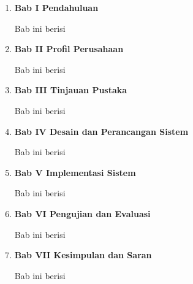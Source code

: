 \begin{enumerate}[nolistsep]

  \item \textbf{Bab I Pendahuluan}
  \vspace{0.5ex}

  Bab ini berisi \lipsum[1][1-3]
  \vspace{0.5ex}

  \item \textbf{Bab II Profil Perusahaan}
  \vspace{0.5ex}

  Bab ini berisi \lipsum[1][1-3]
  \vspace{0.5ex}

  \item \textbf{Bab III Tinjauan Pustaka}
  \vspace{0.5ex}

  Bab ini berisi \lipsum[1][1-3]
  \vspace{0.5ex}

  \item \textbf{Bab IV Desain dan Perancangan Sistem}
  \vspace{0.5ex}

  Bab ini berisi \lipsum[1][1-3]
  \vspace{0.5ex}

  \item \textbf{Bab V Implementasi Sistem}
  \vspace{0.5ex}

  Bab ini berisi \lipsum[1][1-3]
  \vspace{0.5ex}

  \item \textbf{Bab VI Pengujian dan Evaluasi}
  \vspace{0.5ex}

  Bab ini berisi \lipsum[1][1-3]
  \vspace{0.5ex}

  \item \textbf{Bab VII Kesimpulan dan Saran}
  \vspace{0.5ex}

  Bab ini berisi \lipsum[1][1-3]
  \vspace{0.5ex}

\end{enumerate}
\vspace{0.5ex}
